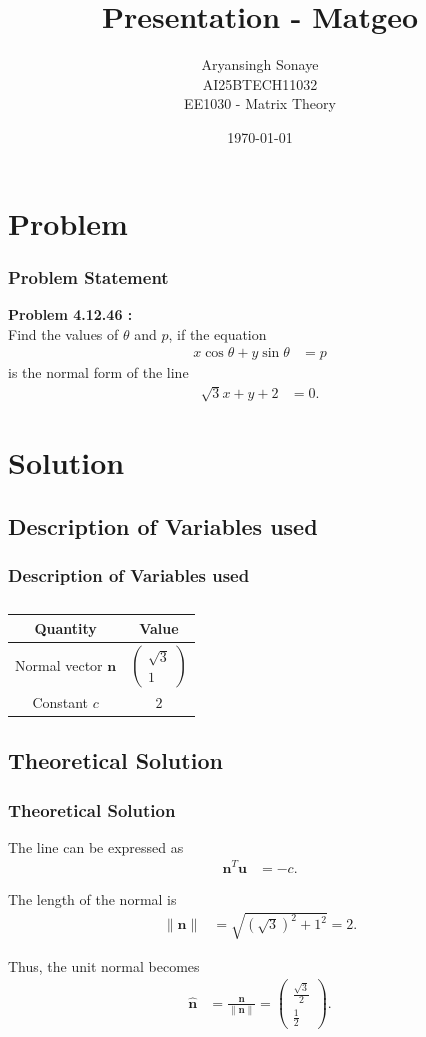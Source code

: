 \documentclass{beamer}
\title{Presentation - Matgeo}
\author{Aryansingh Sonaye \\
AI25BTECH11032 \\
EE1030 - Matrix Theory}
\date{\today}
\theoremstyle{remark}
\newcommand{\myvec}[1]{\ensuremath{\begin{pmatrix}#1\end{pmatrix}}}
\let\vec\mathbf
\numberwithin{equation}{section}
\begin{document}
\begin{frame}
\titlepage
\end{frame}

\section{Problem}
\begin{frame}
\frametitle{Problem Statement}
\textbf{Problem 4.12.46 :}\\
Find the values of $\theta$ and $p$, if the equation
\begin{align}
x\cos\theta + y\sin\theta &= p
\end{align}
is the normal form of the line
\begin{align}
\sqrt{3}x + y + 2 &= 0.
\end{align}
\end{frame}

\section{Solution}
\subsection{Description of Variables used}
\begin{frame}
\frametitle{Description of Variables used}
\begin{table}[H]
\centering
\begin{tabular}{|c|c|}
\hline
\textbf{Quantity} & \textbf{Value} \\
\hline
Normal vector $\vec{n}$ & $\myvec{\sqrt{3} \\ 1}$ \\
\hline
Constant $c$ & $2$ \\
\hline
\end{tabular}
\caption{}
\label{}
\end{table}


\end{frame}

\subsection{Theoretical Solution }
\begin{frame}
\frametitle{Theoretical Solution}
\noindent The line can be expressed as
\begin{align}
\vec{n}^T \vec{u} &= -c. \label{eq1}
\end{align}

The length of the normal is
\begin{align}
\|\vec{n}\| &= \sqrt{(\sqrt{3})^2 + 1^2} = 2. \label{eq2}
\end{align}

Thus, the unit normal becomes
\begin{align}
\hat{\vec{n}} &= \frac{\vec{n}}{\|\vec{n}\|} 
= \myvec{\tfrac{\sqrt{3}}{2} \\[4pt] \tfrac{1}{2}}. \label{eq3}
\end{align}
\end{frame}
\end{document}
